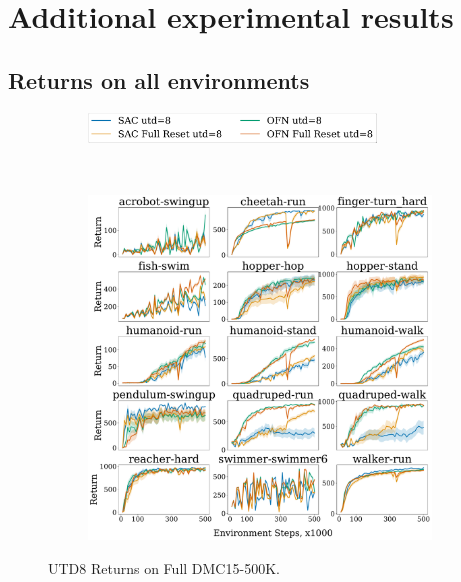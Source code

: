 \newpage

\section{Additional experimental results} \label{app:exp}

\subsection{Returns on all environments} \label{app:exp_ret}

\begin{figure}[H]
\centering
    \begin{subfigure}[b]{0.8\textwidth}
        \centering
        \includegraphics[height=0.8cm]{figures/dissecting/main_exp/utd_8_return_legend.pdf}
    \end{subfigure}\\%
    \begin{subfigure}[b]{1\textwidth}
        \centering
        \includegraphics[width=15cm, trim=0cm 0cm 0cm 0cm ,clip]{figures/dissecting/main_exp/utd_8_return.pdf}
    \end{subfigure}%
    \vspace{-5pt}
    \caption{UTD8 Returns on Full DMC15-500K.}
    \label{fig:utd8_ret}
\end{figure}

